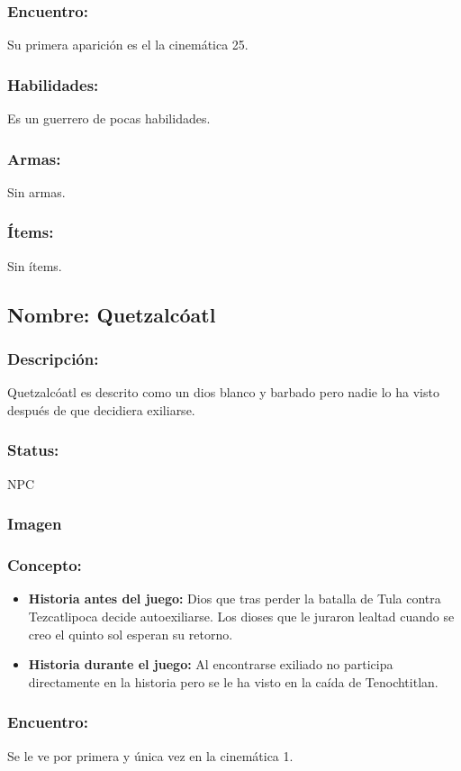\documentclass[11pt,letterpaper]{article}
\begin{document}
\subsubsection{Encuentro:}
Su primera aparición es el la cinemática 25.
\subsubsection{Habilidades:}
Es un guerrero de pocas habilidades. 
\subsubsection{Armas:}
Sin armas.
\subsubsection{Ítems:}
Sin ítems.


\subsection{Nombre: Quetzalcóatl}  
\subsubsection{Descripción:}
Quetzalcóatl es descrito como un dios blanco y barbado pero nadie lo ha visto después de que decidiera exiliarse.
\subsubsection{Status:}
NPC 
\subsubsection{Imagen}
\subsubsection{Concepto:}
\begin{itemize}
	\item \textbf{Historia antes del juego:}
	Dios que tras perder la batalla de Tula contra Tezcatlipoca decide autoexiliarse. Los dioses que le juraron lealtad cuando se creo el quinto sol esperan su retorno.
	\item \textbf{Historia durante el juego:}
	Al encontrarse exiliado no participa directamente en la historia pero se le ha visto en la caída de Tenochtitlan.
\end{itemize} 
\subsubsection{Encuentro:}
Se le ve por primera y única vez en la cinemática 1.
\end{document}
